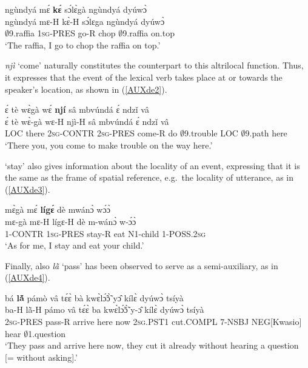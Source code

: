 \begin{exe} 
\ex\label{AUXde1}
  \glll    ngùndyá mɛ́ {\bfseries kɛ́} sɔ́lɛ̀gà ngùndyá dyúwɔ̀ \\
          ngùndyá mɛ-H kɛ̀-H sɔ́lɛga ngùndyá dyúwɔ̀ \\
              $\emptyset$9.raffia 1\textsc{sg}-PRES go-R chop $\emptyset$9.raffia on.top \\
    \trans `The raffia, I go to chop the raffia on top.'
\end{exe}

{\itshape njì} `come' naturally constitutes the counterpart to this altrilocal function. Thus, it expresses that the event of the lexical verb takes place at or towards the speaker's location, as shown in (\ref{AUXde2}).

\begin{exe} 
\ex\label{AUXde2}
  \glll ɛ́ tè wɛ̀gà wɛ́ {\bfseries njí} sâ mbvúndá ɛ́ ndzǐ vâ \\
        ɛ́ tè wɛ̀-gà wɛ-H njì-H sâ mbvúndá ɛ́ ndzǐ vâ \\
        LOC there 2\textsc{sg}-CONTR 2\textsc{sg}-PRES come-R do $\emptyset$9.trouble LOC $\emptyset$9.path here \\
    \trans `There you, you come to make trouble on the way here.'
\end{exe}

 `stay' also gives information about the locality of an event, expressing that it is the same as the frame of spatial reference, e.g.\ the locality of utterance, as in (\ref{AUXde3}). 
 

\begin{exe} 
\ex\label{AUXde3}
  \glll  mɛ̀gà mɛ́ {\bfseries lígɛ́} dè mwánɔ̀ wɔ́ɔ̀ \\
        mɛ-gà mɛ-H lígɛ-H dè m-wánɔ̀ w-ɔ́ɔ̀ \\
          1-CONTR 1\textsc{sg}-PRES stay-R eat N1-child 1-POSS.2\textsc{sg}  \\
    \trans `As for me, I stay and eat your child.'
\end{exe}


\noindent Finally, also {\itshape lã̀} `pass' has been observed to serve as a semi-auxiliary, as in (\ref{AUXde4}).

\begin{exe} 
\ex\label{AUXde4} 
  \glll bá {\bfseries lã́} pámò vâ tɛ́ɛ̀ bà kwɛ̀lɔ̃́ɔ̃̀ yɔ̂ kílɛ̀ dyúwɔ̀  tsíyà \\
      ba-H lã̀-H pámo vâ tɛ́ɛ̀ ba kwɛ̀lɔ̃́ɔ̃̀ y-ɔ̂ kílɛ̀ dyúwɔ̀  tsíyà \\
       2\textsc{sg}-PRES pass-R arrive here now 2\textsc{sg}.PST1 cut.COMPL 7-NSBJ NEG[Kwasio] hear $\emptyset$1.question  \\
    \trans `They pass and arrive here now, they cut it already without hearing a question [= without asking].'
\end{exe}






